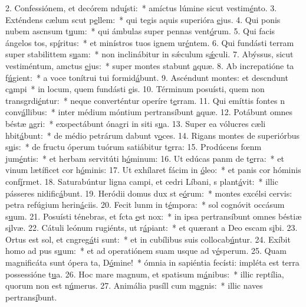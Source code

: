 2. Confessiónem, et decórem ndu\uline{í}sti:~* amíctus lúmine sicut vestim\uline{é}nto.
3. Exténdens cælum scut p\uline{e}llem:~* qui tegis aquis superióra \uline{e}jus.
4. Qui ponis nubem ascnsum t\uline{u}um:~* qui ámbulas super pennas vent\uline{ó}rum.
5. Qui facis ángelos tos, sp\uline{í}ritus:~* et minístros tuos ignem ur\uline{é}ntem.
6. Qui fundásti terram super stabilittem s\uline{u}am:~* non inclinábitur in sǽculum s\uline{ǽ}culi.
7. Abýssus, sicut vestiméntum, amctus \uline{e}jus:~* super montes stabunt \uline{a}quæ.
8. Ab increpatióne ta f\uline{ú}gient:~* a voce tonítrui tui formid\uline{á}bunt.
9. Ascéndunt montes: et descndunt c\uline{a}mpi~* in locum, quem fundásti \uline{e}is.
10. Términum posuísti, quem non transgrdi\uline{é}ntur:~* neque converténtur operíre t\uline{e}rram.
11. Qui emíttis fontes n conv\uline{á}llibus:~* inter médium móntium pertransíbunt \uline{a}quæ.
12. Potábunt omnes béstæ \uline{a}gri:~* exspectábunt ónagri in siti s\uline{u}a.
13. Super ea vólucres cæli hbit\uline{á}bunt:~* de médio petrárum dabunt v\uline{o}ces.
14. Rigans montes de superiórbus s\uline{u}is:~* de fructu óperum tuórum satiábitur t\uline{e}rra:
15. Prodúcens fœnm jum\uline{é}ntis:~* et herbam servitúti h\uline{ó}minum:
16. Ut edúcas panm de t\uline{e}rra:~* et vinum lætíficet cor h\uline{ó}minis:
17. Ut exhílaret fácim in \uline{ó}leo:~* et panis cor hóminis conf\uline{í}rmet.
18. Saturabúntur ligna campi, et cedri Líbani, s plant\uline{á}vit:~* illic pásseres nidific\uline{á}bunt.
19. Heródii domus dux st e\uline{ó}rum:~* montes excélsi cervis: petra refúgium herin\uline{á}ciis.
20. Fecit lunm in t\uline{é}mpora:~* sol cognóvit occásum s\uline{u}um.
21. Posuísti ténebras, et fcta \uline{e}st nox:~* in ipsa pertransíbunt omnes béstiæ s\uline{i}lvæ.
22. Cátuli leónum rugiénts, ut r\uline{á}piant:~* et quærant a Deo escam s\uline{i}bi.
23. Ortus est sol, et cngreg\uline{á}ti sunt:~* et in cubílibus suis collocab\uline{ú}ntur.
24. Exíbit homo ad pus s\uline{u}um:~* et ad operatiónem suam usque ad v\uline{é}sperum.
25. Quam magnificáta sunt ópera ta, D\uline{ó}mine!~* ómnia in sapiéntia fecísti: impléta est terra possessióne t\uline{u}a.
26. Hoc mare magnum, et spatisum m\uline{á}nibus:~* illic reptília, quorum non est n\uline{ú}merus.
27. Animália pusíll cum m\uline{a}gnis:~* illic naves pertrans\uline{í}bunt.
